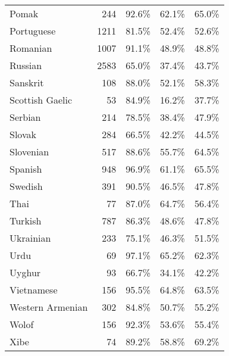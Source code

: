 \begin{longtable}{lrrrr}
    Pomak & 244 & 92.6\% & 62.1\% & 65.0\% \\
    Portuguese & 1211 & 81.5\% & 52.4\% & 52.6\% \\
    Romanian & 1007 & 91.1\% & 48.9\% & 48.8\% \\
    Russian & 2583 & 65.0\% & 37.4\% & 43.7\% \\
    Sanskrit & 108 & 88.0\% & 52.1\% & 58.3\% \\
    Scottish Gaelic & 53 & 84.9\% & 16.2\% & 37.7\% \\
    Serbian & 214 & 78.5\% & 38.4\% & 47.9\% \\
    Slovak & 284 & 66.5\% & 42.2\% & 44.5\% \\
    Slovenian & 517 & 88.6\% & 55.7\% & 64.5\% \\
    Spanish & 948 & 96.9\% & 61.1\% & 65.5\% \\
    Swedish & 391 & 90.5\% & 46.5\% & 47.8\% \\
    Thai & 77 & 87.0\% & 64.7\% & 56.4\% \\
    Turkish & 787 & 86.3\% & 48.6\% & 47.8\% \\
    Ukrainian & 233 & 75.1\% & 46.3\% & 51.5\% \\
    Urdu & 69 & 97.1\% & 65.2\% & 62.3\% \\
    Uyghur & 93 & 66.7\% & 34.1\% & 42.2\% \\
    Vietnamese & 156 & 95.5\% & 64.8\% & 63.5\% \\
    Western Armenian & 302 & 84.8\% & 50.7\% & 55.2\% \\
    Wolof & 156 & 92.3\% & 53.6\% & 55.4\% \\
    Xibe & 74 & 89.2\% & 58.8\% & 69.2\% \\
\end{longtable}


